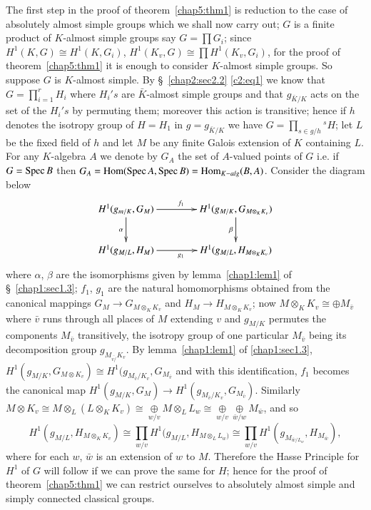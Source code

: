The first step in the proof of theorem~\ref{chap5:thm1} is reduction
to the case of 
absolutely almost simple groups which we shall now carry out; $G$ is a
finite product of $K$-almost simple groups say $G = \prod G_i$; since
$H^1(K,G) \cong H^1 (K,G_i)$, $H^1(K_v,G)\cong \prod H^1(K_v,G_i)$, for
the proof of theorem~\ref{chap5:thm1} it is enough to consider
$K$-almost simple 
groups. So suppose $G$ is $K$-almost simple. By \S~\ref{chap2:sec2.2} \eqref{c2:eq1} 
we know 
that $G= \prod\limits^{r}_{i=1} H_i$ where $H_i's$ are
$\bar{K}$-almost simple groups and that $g_{\bar{K}/K}$ acts on the
set of the $H_i's$ by permuting them; moreover this action is
transitive; hence if $h$ denotes the isotropy group of $H=H_1$ in
$g=g_{\bar{K}/K}$ we have $G=\prod\limits_{s \in g/h}{}^s H$; let $L$
be the fixed field of $h$ and let $M$ be any finite Galois extension
of $K$ containing $L$. For any $K$-algebra $A$ we denote by $G_A$ the
set of $A$-valued points of $G$ i.e. if $G= \operatorname{Spec} B$ then
$G_A = \operatorname{Hom} (\operatorname{Spec} A ,\operatorname{Spec} B) = \operatorname{Hom}_{K-alg}(B,A)$. Consider the
diagram below  
\[
\xymatrix@C=1.4cm{
H^1 (g_{m/K}, G_M) \ar[r]^{f_1} \ar[d]_{\alpha} & H^1 (g_{M/K},
G_{M\otimes_K K_v}) \ar[d]_{\beta}\\
H^1 (g_{M/L}, H_M) \ar[r]_{g_1} & H^1 (g_{M/L} , H_{M\otimes_K K_v})
}
\]
 where \pageoriginale $\alpha$, $\beta$ are the isomorphisms given by
 lemma~\ref{chap1:lem1} of \S~\ref{chap1:sec1.3}; $f_1$, $g_1$
 are the natural  homomorphisms 
 obtained from the canonical mappings $G_M \to G_{M \otimes_K K_v}$
 and $H_M \to H_{M \otimes_K K_v}$; now $M \otimes_K K_v \cong \oplus
 M_{\bar{v}}$  where $\bar{v}$ runs through all places of $M$
 extending $v$ and 
 $g_{M/K}$ permutes the components $M_{\bar{v}}$ transitively, the
 isotropy group of one particular $M_{\bar{v}}$ being its
 decomposition group $g_{M_{\bar{v/}}K_v}$. By lemma~\ref{chap1:lem1} of
 \ref{chap1:sec1.3}, $H^1(g_{M/K}, G_{M \otimes K_v})\cong H^1(g_{M_{\bar{v}}/K_v},
 G_{M_{\bar{v}}}$ and with this identification, $f_1$ becomes the
 canonical map $H^1(g_{M/K}, G_M) \to H^1(g_{M_{\bar{v}}/K_v},
 G_{M_{\bar{v}}})$. Similarly $M \otimes K_v \cong M \otimes_L(L
 \otimes_K K_v) \cong \underset{w/v}\oplus M \otimes_L L_w \cong
 \underset{w/v}\oplus \underset{\bar{w}/w}\oplus M_{\bar{w}}$, and so  
 $$
H^1(g_{M/L}, H_{M \otimes_{K} K_v}) \cong
 \prod_{w/v}H^1(g_{M/L},H_{M \otimes_{L} L_w)} \cong
 \prod_{w/v}H^1(g_{M_{\bar{w}/L_w}}, H_{M_{\bar{w}}}),
$$
 where for each $w$, $\bar{w}$ is an extension of $w$ to $M$. Therefore
 the Hasse Principle for $H^1$ of $G$ will follow if we can prove the
 same for $H$; hence for the proof of theorem~\ref{chap5:thm1} we can restrict
 ourselves to absolutely almost simple and simply connected classical
 groups.  
 
